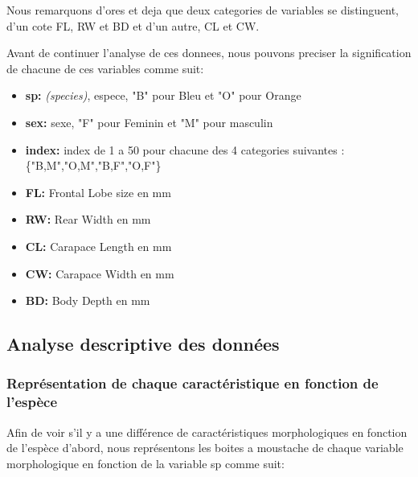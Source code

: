 \documentclass[10pt]{article}
\begin{document}
Nous remarquons d'ores et deja que deux categories de variables se distinguent, d'un cote FL, RW et BD et d'un autre, CL et CW.

Avant de continuer l'analyse de ces donnees, nous pouvons preciser la signification de chacune de ces variables comme suit:
\begin{itemize}
	\item \textbf{sp:} \textit{(species)}, espece, "B" pour Bleu et "O" pour Orange
	\item \textbf{sex:} sexe, "F" pour Feminin et "M" pour masculin
	\item \textbf{index:} index de 1 a 50 pour chacune des 4 categories suivantes : \{"B,M","O,M","B,F","O,F"\}
	\item \textbf{FL:} Frontal Lobe size en mm
	\item \textbf{RW:} Rear Width en mm
	\item \textbf{CL:} Carapace Length en mm
	\item \textbf{CW:} Carapace Width en mm 
	\item \textbf{BD:} Body Depth en mm
\end{itemize}

\subsection{Analyse descriptive des données}

\subsubsection{Représentation de chaque caractéristique en fonction de l'espèce}

Afin de voir s'il y a une différence de caractéristiques morphologiques en fonction de l'espèce d'abord, nous représentons les boites a moustache de chaque variable morphologique en fonction de la variable sp comme suit:
\end{document}
